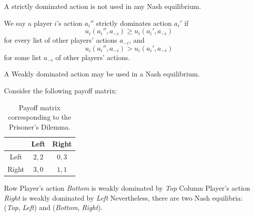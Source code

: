\begin{corollary}
      \normalfont A strictly dominated action is not used in any Nash equilibrium.
\end{corollary}


\begin{definition}
      We say a player $i$'s action $a_i''$ strictly dominates action $a_i'$ if
      \[
            u_i (a_i'' , a_{-i} ) \ge u_i (a_i' , a_{-i} )
      \]
      for every list of other players' actions $a_{-i}$, and
      \[
            u_i (a_i'' , a_{-i} ) > u_i (a_i' , a_{-i} )
      \]
      for some list $a_{-i}$ of other players' actions.
\end{definition}


\begin{note}
      \normalfont A Weakly dominated action may be used in a Nash equilibrium.
\end{note}


\begin{example}
      Consider the following payoff matrix:
      \begin{table}[h!]
            \begin{center}
                  \begin{tabular}{ c | c c }
                              & Left  & Right  \\ \hline
                        Left  & $2,2$ & $0,3$  \\
                        Right & $3,0$ & $1, 1$
                  \end{tabular}
                  \caption{Payoff matrix corresponding to the Prisoner's Dilemma.}
            \end{center}
      \end{table}
      \vspace{-15pt}

      Row Player's action \textit{Bottom} is weakly dominated by \textit{Top}
      Column Player's action \textit{Right} is weakly dominated by \textit{Left}
      Nevertheless, there are two Nash equilibria: (\textit{Top}, \textit{Left}) and (\textit{Bottom}, \textit{Right}).
\end{example}


